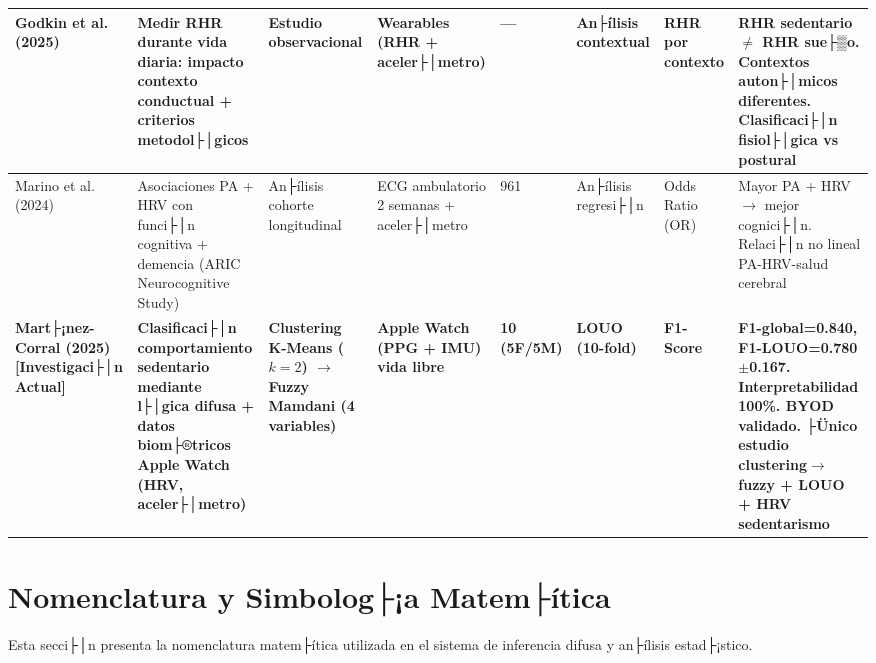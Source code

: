 \begin{landscape}
\begin{longtable}{@{}p{1.8cm}p{2.5cm}p{1.8cm}p{1.5cm}p{0.9cm}p{1.3cm}p{2.0cm}p{1.8cm}@{}}
\midrule


Godkin et al. (2025) \cite{Godkin2025Context} & 
Medir RHR durante vida diaria: impacto contexto conductual + criterios metodol├│gicos & 
Estudio observacional & 
Wearables (RHR + aceler├│metro) & 
--- & 
An├ílisis contextual & 
RHR por contexto & 
\textbf{RHR sedentario $\neq$ RHR sue├▒o}. Contextos auton├│micos diferentes. Clasificaci├│n fisiol├│gica vs postural \\

\midrule

Marino et al. (2024) \cite{Marino2024ARIC} & 
Asociaciones PA + HRV con funci├│n cognitiva + demencia (ARIC Neurocognitive Study) & 
An├ílisis cohorte longitudinal & 
ECG ambulatorio 2 semanas + aceler├│metro & 
961 & 
An├ílisis regresi├│n & 
Odds Ratio (OR) & 
Mayor PA + HRV $\rightarrow$ mejor cognici├│n. Relaci├│n no lineal PA-HRV-salud cerebral \\

\midrule


\textbf{Mart├¡nez-Corral (2025)} \newline \textbf{[Investigaci├│n Actual]} & 
\textbf{Clasificaci├│n comportamiento sedentario mediante l├│gica difusa + datos biom├®tricos Apple Watch (HRV, aceler├│metro)} & 
\textbf{Clustering K-Means ($k=2$) $\rightarrow$ Fuzzy Mamdani (4 variables)} & 
\textbf{Apple Watch (PPG + IMU) vida libre} & 
\textbf{10 (5F/5M)} & 
\textbf{LOUO (10-fold)} & 
\textbf{F1-Score} & 
\textbf{F1-global=0.840, F1-LOUO=0.780$\pm$0.167. Interpretabilidad 100\%. BYOD validado. ├Ünico estudio clustering$\rightarrow$fuzzy + LOUO + HRV sedentarismo} \\

\end{longtable}
\end{landscape}


\section{Nomenclatura y Simbolog├¡a Matem├ítica}
\label{sec:nomenclatura}

Esta secci├│n presenta la nomenclatura matem├ítica utilizada en el sistema de inferencia difusa y an├ílisis estad├¡stico.

